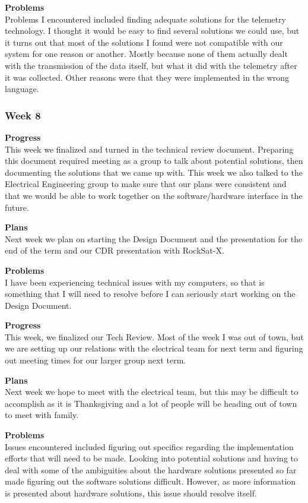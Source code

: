 \textbf{Problems} \\
Problems I encountered included finding adequate solutions for the telemetry technology. I thought it would be easy to find several solutions we could use, but it turns out that most of the solutions I found were not compatible with our system for one reason or another. Mostly because none of them actually dealt with the transmission of the data itself, but what it did with the telemetry after it was collected. Other reasons were that they were implemented in the wrong language.

\subsubsection{Week 8}
\textbf{Progress} \\
This week we finalized and turned in the technical review document. Preparing this document required meeting as a group to talk about potential solutions, then documenting the solutions that we came up with. This week we also talked to the Electrical Engineering group to make sure that our plans were consistent and that we would be able to work together on the software/hardware interface in the future.

\textbf{Plans} \\
Next week we plan on starting the Design Document and the presentation for the end of the term and our CDR presentation with RockSat-X.

\textbf{Problems} \\
I have been experiencing technical issues with my computers, so that is something that I will need to resolve before I can seriously start working on the Design Document.

\textbf{Progress} \\
This week, we finalized our Tech Review. Most of the week I was out of town, but we are setting up our relations with 
the electrical team for next term and figuring out meeting times for our larger group next term.

\textbf{Plans} \\
Next week we hope to meet with the electrical team, but this may be difficult to accomplish as it is Thanksgiving
and a lot of people will be heading out of town to meet with family.

\textbf{Problems} \\
Issues encountered included figuring out specifics regarding the implementation efforts that will need to be made.
Looking into potential solutions and having to deal with some of the ambiguities about the hardware solutions
presented so far made figuring out the software solutions difficult. However, as more information is
presented about hardware solutions, this issue should resolve itself.

